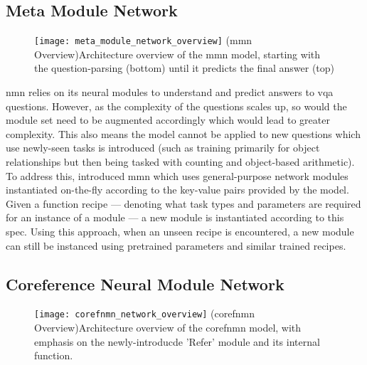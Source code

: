 
\subsection{Meta Module Network}
\label{subsec:meta_module_network}

\begin{figure}[htbp]
    \centering
    \texttt{[image: meta\_module\_network\_overview]}
    \captionsource(\acrshort{mmn} Overview){Architecture overview of the \acrshort{mmn} model, starting with the question-parsing (bottom) until it predicts the final answer (top) \label{fig:mmn_overview}}{\citeauthor{chen_meta_2020}\cite{chen_meta_2020}}
\end{figure}

\gls{nmn} relies on its neural modules to understand and predict answers to \gls{vqa} questions.
However, as the complexity of the questions scales up, so would the module set need to be augmented accordingly which would lead to greater complexity.
This also means the model cannot be applied to new questions which use newly-seen tasks is introduced (such as training primarily for object relationships but then being tasked with counting and object-based arithmetic).
To address this, \citeauthor{chen_meta_2020} introduced \gls{mmn} \cite{chen_meta_2020} which uses general-purpose network modules instantiated on-the-fly according to the key-value pairs provided by the model.
Given a function recipe --- denoting what task types and parameters are required for an instance of a module --- a new module is instantiated according to this spec.
Using this approach, when an unseen recipe is encountered, a new module can still be instanced using pretrained parameters and similar trained recipes.


\subsection{Coreference Neural Module Network}
\label{subsec:coreference_neural_module_network}

\begin{figure}[htbp]
    \centering
    \texttt{[image: corefnmn\_network\_overview]}
    \captionsource(\acrshort{corefnmn} Overview){Architecture overview of the \acrshort{corefnmn} model, with emphasis on the newly-introducde 'Refer' module and its internal function. \label{fig:corefnmn_overview}}{\citeauthor{kottur_visual_2018}\cite{kottur_visual_2018}}
\end{figure}

